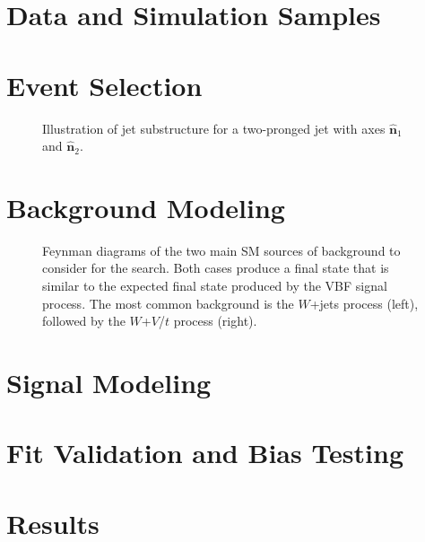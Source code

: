 \section{Data and Simulation Samples}
\label{sec:samples}

\section{Event Selection}
\label{sec:events}

\begin{figure}[htbp]
  \centering
  
  \caption{Illustration of jet substructure for a two-pronged jet with axes $\mathbf{\hat{n}}_1$ and $\mathbf{\hat{n}}_2$.}
  \label{fig:jet}
\end{figure}

\section{Background Modeling}
\label{sec:bkg}

\begin{figure}[htbp]
  \centering
  
  \caption{Feynman diagrams of the two main SM sources of background to consider for the search. Both cases produce a final state that is similar to the expected final state produced by the VBF signal process. The most common background is the $W$+jets process (left), followed by the $W$+$V$/$t$ process (right).}
  \label{fig:bkgFeynman}
\end{figure}

\section{Signal Modeling}
\label{sec:sig}

\section{Fit Validation and Bias Testing}
\label{sec:bias}

\section{Results}
\label{sec:results}
